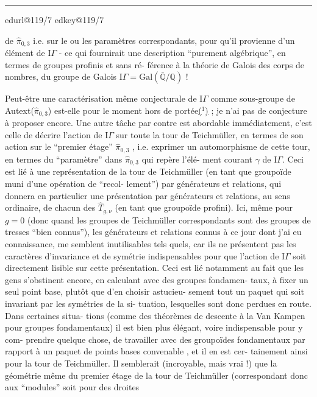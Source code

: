 \documentclass[11pt,a4paper]{article}
\makeatletter
\newif\ifdiplomatic
\newif\ifreading
\newif\ifenglish
\def\CurrentScanURL{}
\def\CurrentPageKey{}
\def\CurrentApparatus{}
\newcounter{appnote}
\newcommand{\scanpage}[1]{%
  \clearpage
  \expandafter\let\expandafter\CurrentScanURL\csname edurl@#1\endcsname
  \expandafter\let\expandafter\CurrentPageKey\csname edkey@#1\endcsname
  \def\CurrentApparatus{}%
  \hypertarget{scan-\CurrentPageKey}{}%
  \typeout{EDITION-SCAN: \CurrentPageKey; PDFPAGE: \the\numexpr\ReadonlyShipoutCounter+1\relax}%
  \ifreading
    \marginnote{\raggedright\scriptsize\sffamily\href{\CurrentScanURL}{119 / \csname edpage@#1\endcsname}}%
  \else
    \noindent{\small\sffamily\href{\CurrentScanURL}{[scan #1]}}\par\smallskip
  \fi}
\newcommand{\mspage}[1]{%
  \ifreading\marginnote{\raggedright\scriptsize\sffamily p.\,#1}[2\baselineskip]%
  \else\noindent{\small\sffamily[p.\,#1]}\par\smallskip\fi}
\newcommand{\margin}[1]{%
  \sbox{\MarginalTestBox}{\parbox{\marginparwidth}{\raggedright\footnotesize#1}}%
  \ifdim\dimexpr\ht\MarginalTestBox+\dp\MarginalTestBox\relax>3\baselineskip
    \par\smallskip\noindent\begin{minipage}{\linewidth}\hrule\smallskip
    {\footnotesize\textcolor{HandInk}{\ifenglish Marginal note:\else Note marginale :\fi\ #1}}\smallskip\hrule\end{minipage}\par\smallskip
  \else
    \marginnote{\raggedright\footnotesize\textcolor{HandInk}{#1}}%
  \fi}
\newcommand{\AppItem}[2]{\par\noindent\textsuperscript{#1}\csname edvariant@#2\endcsname}
\newcommand{\EditionApp}[1]{%
  \stepcounter{appnote}%
  \ifmmode{}^{\scriptscriptstyle\theappnote}\else\textsuperscript{\theappnote}\fi
  \begingroup\edef\x{\endgroup\noexpand\gappto\noexpand\CurrentApparatus{\noexpand\AppItem{\theappnote}{#1}}}\x}
\newcommand{\var}[4]{\ifdiplomatic#1\else#2\ifreading\else\EditionApp{#4}\fi\fi}
\newcommand{\finishscan}{\ifx\CurrentApparatus\empty\else\par\bigskip\noindent\rule{.35\linewidth}{.35pt}\par\smallskip{\footnotesize\setlength{\parskip}{3pt}\CurrentApparatus}\fi}
\newcommand{\notecall}[3]{\hypertarget{#2}{\hyperlink{note-#1}{#3}}}
\makeatother
\begin{document}
\margin{6}

\finishscan
\scanpage{119/7}
\mspage{5}

de $\hat{\pi}_{0,3}$ i.e. sur le ou les paramètres correspondants, pour qu'il
provienne d'un élément de $\mathrm{I}\!\Gamma$ - ce qui fournirait une description
``purement algébrique'', en termes de groupes profinis et sans ré-%
férence à la théorie de Galois des corps de nombres, du groupe de
Galois $\mathrm{I}\!\Gamma = \mathrm{Gal}(\bar{\mathbb{Q}}/\mathbb{Q})$ !

Peut-être une caractérisation même conjecturale de $\mathrm{I}\!\Gamma$
comme sous-groupe de Autext($\hat{\pi}_{0,3}$) est-elle pour le moment hors de
portée\notecall{copy1-1}{call-esq_119_007-1-1}{($^1$)} ; je n'ai pas de conjecture à proposer encore. Une autre
tâche par contre est abordable immédiatement, c'est celle de décrire
l'action de $\mathrm{I}\!\Gamma$ sur toute la tour de Teichmüller, en termes de son
action sur le ``premier étage'' $\hat{\pi}_{0,3}$ , i.e. exprimer un automorphisme
de cette tour, en termes du ``paramètre'' dans $\hat{\pi}_{0,3}$ qui repère l'élé-%
ment courant $\gamma$ de $\mathrm{I}\!\Gamma$. Ceci est lié à une représentation de la tour
de Teichmüller (en tant que groupoïde muni d'une opération de ``recol-%
lement'') par générateurs et relations, qui donnera en particulier
une présentation par générateurs et relations, au sens ordinaire, de
chacun des $\hat{T}_{g,\nu}$ (en tant que groupoïde profini). Ici, même pour
$g = 0$ (donc quand les groupes de Teichmüller correspondants sont
des groupes de tresses ``bien connus''), les générateurs et relations
connus à ce jour dont j'ai eu connaissance, me semblent inutilisables
tels quels, car ils ne présentent pas les caractères d'invariance et
de symétrie indispensables pour que l'action de $\mathrm{I}\!\Gamma$ soit directement
lisible sur cette présentation. Ceci est lié notamment au fait que
les gens s'obstinent encore, en calculant avec des groupes fondamen-%
taux, à fixer un seul point base, plutôt que d'en choisir astucieu-%
sement tout un paquet qui soit invariant par les symétries de la si-%
tuation, lesquelles sont donc perdues en route. Dans certaines situa-%
tions (comme des théorèmes de descente à la Van Kampen pour groupes
fondamentaux) il est bien plus élégant, \var{voir indispensable}{voire indispensable}{slip corrected}{V-FR-007-001} pour y com-%
prendre quelque chose, de travailler avec des groupoïdes fondamentaux
par rapport à un paquet de points bases convenable , et il en est cer-%
tainement ainsi pour la tour de Teichmüller. Il semblerait (incroyable,
mais vrai !) que la géométrie même du premier étage de la tour de
Teichmüller (correspondant donc aux ``modules'' soit pour des droites
\end{document}
